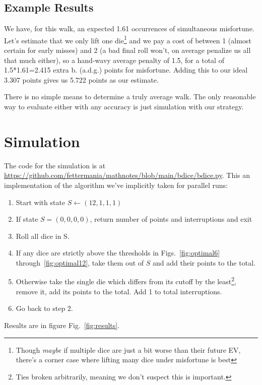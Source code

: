 \documentclass[11pt, oneside]{article} 	%
\begin{document}
\subsection{Example Results}

We have, for this walk, an expected 1.61 occurrences of simultaneous misfortune. Let's estimate that we only lift one die\footnote{Though \emph{maybe} if multiple dice are just a bit worse than their future EV, there's a corner case where lifting many dice under misfortune is best} and we pay a cost of between 1 (almost certain for early misses) and 2 (a bad final roll won't, on average penalize us all that much either), so a hand-wavy average penalty of 1.5, for a total of 1.5*1.61=2.415 extra b. (a.d.g.) points for misfortune. Adding this to our ideal 3.307 points gives us 5.722 points as our estimate.

There is no simple means to determine a truly average walk.   The only reasonable way to evaluate either with any accuracy is just simulation with our strategy. 

\section{Simulation} \label {section:simulation}

The code for the simulation is at \url{https://github.com/fettermania/mathnotes/blob/main/bdice/bdice.py}.  This an implementation of the algorithm we've implicitly taken for parallel runs:
\begin{enumerate}
\item Start with state $S \leftarrow (12,1,1,1)$
\item If state $S = (0, 0, 0, 0)$, return number of points and interruptions and exit
\item Roll all dice in S.
\item If any dice are strictly above the thresholds in Figs.~\ref{fig:optimal6} through~\ref{fig:optimal12}, take them out of $S$ and add their points to the total.
\item Otherwise take the single die which differs from its cutoff by the least\footnote{Ties broken arbitrarily, meaning we don't suspect this is important.}, remove it, add its points to the total.  Add 1 to total interruptions.
\item Go back to step 2.
\end{enumerate}

Results are in figure Fig.~\ref{fig:results}.
\end{document}
